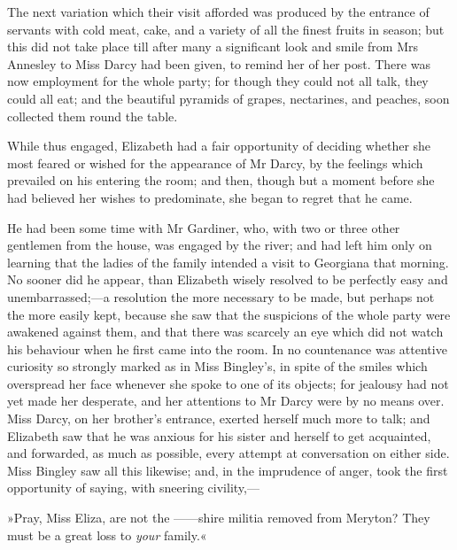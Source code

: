 The next variation which their visit afforded was produced by the entrance of servants with cold meat, cake, and a variety of all the finest fruits in season; but this did not take place till after many a significant look and smile from Mrs Annesley to Miss Darcy had been given, to remind her of her post. There was now employment for the whole party; for though they could not all talk, they could all eat; and the beautiful pyramids of grapes, nectarines, and peaches, soon collected them round the table.

While thus engaged, Elizabeth had a fair opportunity of deciding whether she most feared or wished for the appearance of Mr Darcy, by the feelings which prevailed on his entering the room; and then, though but a moment before she had believed her wishes to predominate, she began to regret that he came.

He had been some time with Mr Gardiner, who, with two or three other gentlemen from the house, was engaged by the river; and had left him only on learning that the ladies of the family intended a visit to Georgiana that morning. No sooner did he appear, than Elizabeth wisely resolved to be perfectly easy and unembarrassed;—a resolution the more necessary to be made, but perhaps not the more easily kept, because she saw that the suspicions of the whole party were awakened against them, and that there was scarcely an eye which did not watch his behaviour when he first came into the room. In no countenance was attentive curiosity so strongly marked as in Miss Bingley's, in spite of the smiles which overspread her face whenever she spoke to one of its objects; for jealousy had not yet made her desperate, and her attentions to Mr Darcy were by no means over. Miss Darcy, on her brother's entrance, exerted herself much more to talk; and Elizabeth saw that he was anxious for his sister and herself to get acquainted, and forwarded, as much as possible, every attempt at conversation on either side. Miss Bingley saw all this likewise; and, in the imprudence of anger, took the first opportunity of saying, with sneering civility,—

»Pray, Miss Eliza, are not the ——shire militia removed from Meryton? They must be a great loss to \textit{your} family.«

